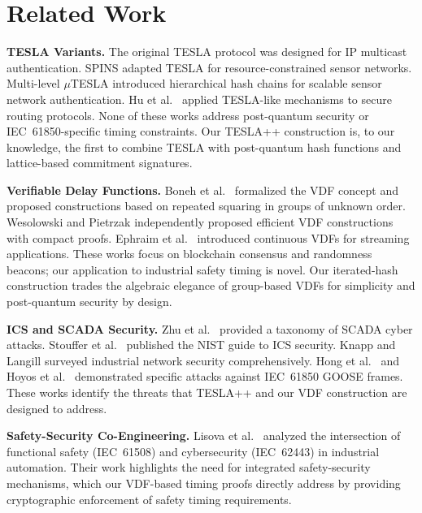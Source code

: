 \documentclass[conference,10pt]{IEEEtran}
\begin{document}
\section{Related Work}
\label{sec:related}

\textbf{TESLA Variants.} The original TESLA protocol \cite{perrig2000tesla,perrig2002tesla} was designed for IP multicast authentication. SPINS \cite{perrig2001spins} adapted TESLA for resource-constrained sensor networks. Multi-level $\mu$TESLA \cite{liu2004multilevel} introduced hierarchical hash chains for scalable sensor network authentication. Hu et al.\ \cite{hu2005efficient} applied TESLA-like mechanisms to secure routing protocols. None of these works address post-quantum security or IEC~61850-specific timing constraints. Our TESLA++ construction is, to our knowledge, the first to combine TESLA with post-quantum hash functions and lattice-based commitment signatures.

\textbf{Verifiable Delay Functions.} Boneh et al.\ \cite{boneh2018vdf} formalized the VDF concept and proposed constructions based on repeated squaring in groups of unknown order. Wesolowski \cite{wesolowski2019vdf} and Pietrzak \cite{pietrzak2019simple} independently proposed efficient VDF constructions with compact proofs. Ephraim et al.\ \cite{ephraim2020continuous} introduced continuous VDFs for streaming applications. These works focus on blockchain consensus and randomness beacons; our application to industrial safety timing is novel. Our iterated-hash construction trades the algebraic elegance of group-based VDFs for simplicity and post-quantum security by design.

\textbf{ICS and SCADA Security.} Zhu et al.\ \cite{zhu2011scada} provided a taxonomy of SCADA cyber attacks. Stouffer et al.\ \cite{stouffer2015guide} published the NIST guide to ICS security. Knapp and Langill \cite{knapp2024industrial} surveyed industrial network security comprehensively. Hong et al.\ \cite{hong2014goose} and Hoyos et al.\ \cite{hoyos2012goose} demonstrated specific attacks against IEC~61850 GOOSE frames. These works identify the threats that TESLA++ and our VDF construction are designed to address.

\textbf{Safety-Security Co-Engineering.} Lisova et al.\ \cite{lisova2018safety} analyzed the intersection of functional safety (IEC~61508) and cybersecurity (IEC~62443) in industrial automation. Their work highlights the need for integrated safety-security mechanisms, which our VDF-based timing proofs directly address by providing cryptographic enforcement of safety timing requirements.
\end{document}
